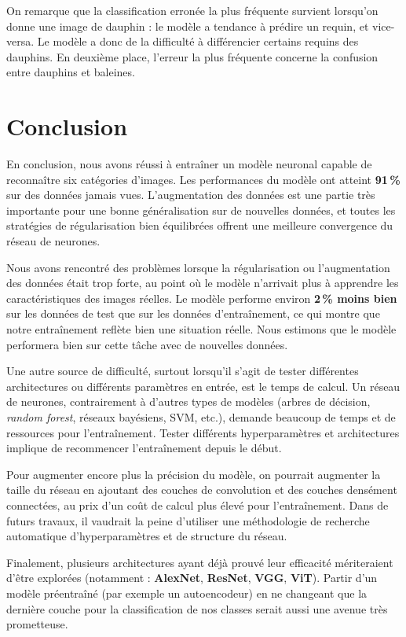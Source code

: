 \documentclass{article}
\begin{document}
On remarque que la classification erronée la plus fréquente survient lorsqu’on donne une image de dauphin : le modèle a tendance à prédire un requin, et vice-versa. Le modèle a donc de la difficulté à différencier certains requins des dauphins. En deuxième place, l’erreur la plus fréquente concerne la confusion entre dauphins et baleines.

\section{ Conclusion }

En conclusion, nous avons réussi à entraîner un modèle neuronal capable de reconnaître six catégories d’images. Les performances du modèle ont atteint \textbf{91\,\%} sur des données jamais vues. L’augmentation des données est une partie très importante pour une bonne généralisation sur de nouvelles données, et toutes les stratégies de régularisation bien équilibrées offrent une meilleure convergence du réseau de neurones.

Nous avons rencontré des problèmes lorsque la régularisation ou l’augmentation des données était trop forte, au point où le modèle n’arrivait plus à apprendre les caractéristiques des images réelles. Le modèle performe environ \textbf{2\,\% moins bien} sur les données de test que sur les données d’entraînement, ce qui montre que notre entraînement reflète bien une situation réelle. Nous estimons que le modèle performera bien sur cette tâche avec de nouvelles données.

Une autre source de difficulté, surtout lorsqu’il s’agit de tester différentes architectures ou différents paramètres en entrée, est le temps de calcul. Un réseau de neurones, contrairement à d’autres types de modèles (arbres de décision, \emph{random forest}, réseaux bayésiens, SVM, etc.), demande beaucoup de temps et de ressources pour l’entraînement. Tester différents hyperparamètres et architectures implique de recommencer l’entraînement depuis le début.

Pour augmenter encore plus la précision du modèle, on pourrait augmenter la taille du réseau en ajoutant des couches de convolution et des couches densément connectées, au prix d’un coût de calcul plus élevé pour l’entraînement. Dans de futurs travaux, il vaudrait la peine d’utiliser une méthodologie de recherche automatique d’hyperparamètres et de structure du réseau.

Finalement, plusieurs architectures ayant déjà prouvé leur efficacité mériteraient d’être explorées (notamment : \textbf{AlexNet}, \textbf{ResNet}, \textbf{VGG}, \textbf{ViT}). Partir d’un modèle préentraîné (par exemple un autoencodeur) en ne changeant que la dernière couche pour la classification de nos classes serait aussi une avenue très prometteuse.
\end{document}
